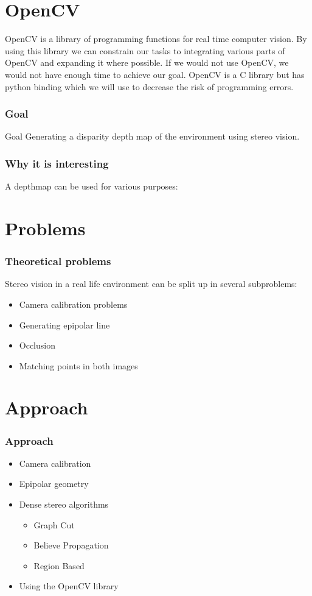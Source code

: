 \documentclass{article}
\begin{document}
\section{OpenCV}
OpenCV is a library of programming functions for real time computer vision. By using this library we can constrain our tasks to integrating various parts of OpenCV and expanding it where possible. If we would not use OpenCV, we would not have enough time to achieve our goal. OpenCV is a C library but has python binding which we will use to decrease the risk of programming errors.

 \frametitle{Goal}
 \begin{block}{Goal}
   Generating a disparity depth map of the environment using stereo vision.
 \end{block}

 \frametitle{Why it is interesting}
   A depthmap can be used for various purposes:



\section{Problems}

 \frametitle{Theoretical problems}
   Stereo vision in a real life environment can be split up in several subproblems:
   \begin{itemize}
    \item Camera calibration problems
    \item Generating epipolar line
    \item Occlusion
    \item Matching points in both images
   \end{itemize}

\section{Approach}

  \frametitle{Approach}
  \begin{itemize}
    \item Camera calibration
    \item Epipolar geometry
     \item Dense stereo algorithms
      \begin{itemize}
       \item Graph Cut
       \item Believe Propagation
       \item Region Based
      \end{itemize}
    \item Using the OpenCV library
  \end{itemize}
\end{document}
